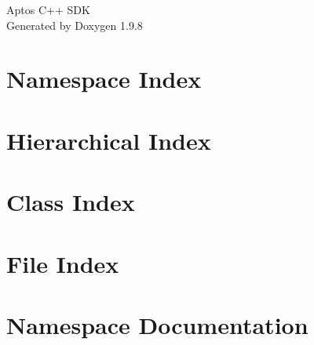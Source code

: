 \documentclass[twoside]{book}
\newcommand{\+}{\discretionary{\mbox{\scriptsize$\hookleftarrow$}}{}{}}
\newcommand{\clearemptydoublepage}{%
    \newpage{\pagestyle{empty}\cleardoublepage}%
  }
\begin{document}
  \raggedbottom
    \hypersetup{pageanchor=false,
                bookmarksnumbered=true,
                pdfencoding=unicode
               }
  \begin{titlepage}
  \vspace*{7cm}
  \begin{center}%
  {\Large Aptos C++ SDK}\\
  \vspace*{1cm}
  {\large Generated by Doxygen 1.9.8}\\
  \end{center}
  \end{titlepage}
  \clearemptydoublepage
  \tableofcontents
  \clearemptydoublepage
  \hypersetup{pageanchor=true}
\chapter{Namespace Index}

\chapter{Hierarchical Index}

\chapter{Class Index}

\chapter{File Index}

\chapter{Namespace Documentation}

\end{document}
